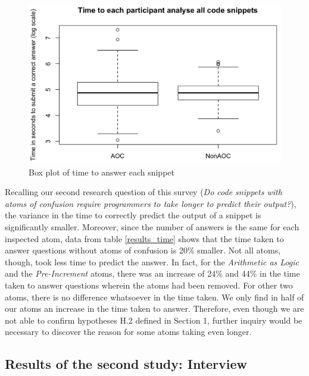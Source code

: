 \begin{figure}[htb!]
      \noindent
      \centering
      \includegraphics[scale=.20]{images/timeeach.png}
      \caption{Box plot of time to answer each snippet}
      \label{fig:timetoanswer}
  \end{figure}
    
Recalling our second research question of this survey (\emph{Do code snippets with atoms of confusion require programmers to take longer to predict their output?}), the variance in the time to correctly predict the output of a snippet is significantly smaller. Moreover, since the number of answers is the same for each inspected atom, data from table \ref{results_time} shows that the time taken to answer questions without atoms of confusion is 20\% smaller. Not all atoms, though, took less time to predict the answer. In fact, for the \emph{Arithmetic as Logic} and the \emph{Pre-Increment} atoms, there was an increase of 24\% and 44\% in the time taken to answer questions wherein the atoms had been removed. For other two atoms, there is no difference whatsoever in the time taken. We only find in half of our atoms an increase in the time taken to answer. Therefore, even though we are not able to confirm hypotheses H.2 defined in Section 1, further inquiry would be necessary to discover the reason for some atoms taking even longer.




\subsection{Results of the second study: Interview}
\label{sec:interview-results}

